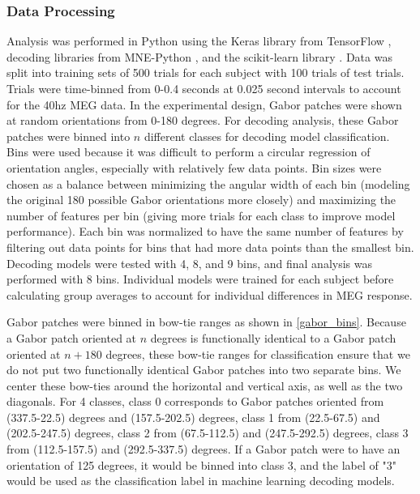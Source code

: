 \documentclass[../main.tex]{subfiles}
\begin{document}
\subsubsection{Data Processing}
Analysis was performed in Python using the Keras \citep{chollet2015keras} library from TensorFlow \citep{tensorflow2015-whitepaper}, decoding libraries from MNE-Python \citep{mne}, and the scikit-learn library \citep{scikit-learn}. Data was split into training sets of 500 trials for each subject with 100 trials of test trials. Trials were time-binned from 0-0.4 seconds at 0.025 second intervals to account for the 40hz MEG data. In the experimental design, Gabor patches were shown at random orientations from 0-180 degrees. For decoding analysis, these Gabor patches were binned into $n$ different classes for decoding model classification. Bins were used because it was difficult to perform a circular regression of orientation angles, especially with relatively few data points. Bin sizes were chosen as a balance between minimizing the angular width of each bin (modeling the original 180 possible Gabor orientations more closely) and maximizing the number of features per bin (giving more trials for each class to improve model performance). Each bin was normalized to have the same number of features by filtering out data points for bins that had more data points than the smallest bin. Decoding models were tested with 4, 8, and 9 bins, and final analysis was performed with 8 bins. Individual models were trained for each subject before calculating group averages to account for individual differences in MEG response.

Gabor patches were binned in bow-tie ranges as shown in \ref{gabor_bins}. Because a Gabor patch oriented at $n$ degrees is functionally identical to a Gabor patch oriented at $n + 180$ degrees, these bow-tie ranges for classification ensure that we do not put two functionally identical Gabor patches into two separate bins. We center these bow-ties around the horizontal and vertical axis, as well as the two diagonals. For 4 classes, class 0 corresponds to Gabor patches oriented from (337.5-22.5) degrees and (157.5-202.5) degrees, class 1 from (22.5-67.5) and (202.5-247.5) degrees, class 2 from (67.5-112.5) and (247.5-292.5) degrees, class 3 from (112.5-157.5) and (292.5-337.5) degrees. If a Gabor patch were to have an orientation of 125 degrees, it would be binned into class 3, and the label of "3" would be used as the classification label in machine learning decoding models. 
\end{document}
